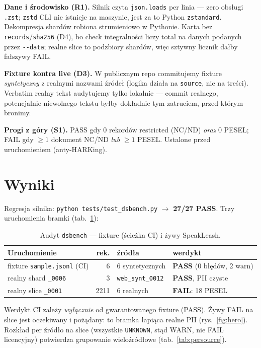 \textbf{Dane i środowisko (R1).} Silnik czyta \texttt{json.loads} per linia --- zero
obsługi \texttt{.zst}; \texttt{zstd} CLI nie istnieje na maszynie, jest za to Python
\texttt{zstandard}. Dekompresja shardów robiona strumieniowo w Pythonie. Karta bez
\texttt{records}/\texttt{sha256} (D4), bo check integralności liczy total na danych
podanych przez \texttt{-{}-data}; realne slice to podzbiory shardów, więc sztywny
licznik dałby fałszywy FAIL.

\textbf{Fixture kontra live (D3).} W publicznym repo commitujemy fixture
\emph{syntetyczny} z realnymi nazwami źródeł (logika działa na \texttt{source}, nie na
treści). Verbatim realny tekst audytujemy tylko lokalnie --- commit realnego,
potencjalnie niewolnego tekstu byłby dokładnie tym zatruciem, przed którym bronimy.

\textbf{Progi z góry (S1).} PASS gdy 0 rekordów restricted (NC/ND) \emph{oraz} 0 PESEL;
FAIL gdy $\ge 1$ dokument NC/ND \emph{lub} $\ge 1$ PESEL. Ustalone przed uruchomieniem
(anty-HARKing).

\section{Wyniki}
Regresja silnika: \texttt{python tests/test\_dsbench.py} $\to$ \textbf{27/27 PASS}.
Trzy uruchomienia bramki (tab.~\ref{tab:runs}):

\begin{table}[h]
  \centering
  \caption{Audyt \texttt{dsbench} --- fixture (ścieżka CI) i żywy SpeakLeash.}
  \label{tab:runs}
  \begin{tabular}{lrll}
    \toprule
    Uruchomienie & rek. & źródła & werdykt \\
    \midrule
    fixture \texttt{sample.jsonl} (CI) & 6    & 6 syntetycznych & \textbf{PASS} (0 błędów, 2 warn) \\
    realny shard \texttt{\_0006}       & 3    & \texttt{web\_synt\_0012} & \textbf{PASS}, PII czyste \\
    realny slice \texttt{\_0001}       & 2211 & 6 realnych & \textbf{FAIL}: 18 PESEL \\
    \bottomrule
  \end{tabular}
\end{table}

Werdykt CI zależy \emph{wyłącznie} od gwarantowanego fixture (PASS). Żywy FAIL na
slice jest oczekiwany i pożądany: to bramka łapiąca realne PII (rys.~\ref{fig:hero}).
Rozkład per źródło na slice (wszystkie \texttt{UNKNOWN}, stąd WARN, nie FAIL
licencyjny) potwierdza grupowanie wieloźródłowe (tab.~\ref{tab:persource}).


